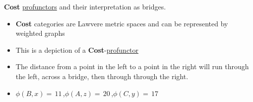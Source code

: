 \textbf{Cost} \href{doc/1 math/Seven Sketches in Compositionality/Chapter 4: Co-design/2 Enriched profunctors/2 V-profunctors/1 V-profunctor}{profunctors} and their interpretation as bridges.
\begin{itemize}
  \item \textbf{Cost} categories are Lawvere metric spaces and can be represented by weighted graphs
  \item This is a depiction of a \textbf{Cost}-\href{doc/1 math/Seven Sketches in Compositionality/Chapter 4: Co-design/2 Enriched profunctors/2 V-profunctors/1 V-profunctor}{profunctor}


  \item The distance from a point in the left to a point in the right will run through the left, across a bridge, then through through the right.
  \item $\phi(B,x)=$\,$11$\,,$\phi(A,z)=$\,$20$\,,$\phi(C,y)=$\,$17$\,

\end{itemize}